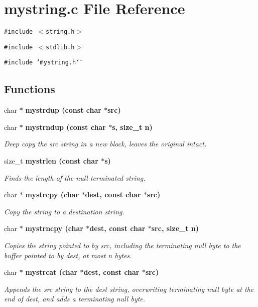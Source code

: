 \section{mystring.c File Reference}
\label{mystring_8c}
{\tt \#include $<$string.h$>$}\par
{\tt \#include $<$stdlib.h$>$}\par
{\tt \#include \char`\"{}mystring.h\char`\"{}}\par
\subsection*{Functions}
\begin{CompactItemize}
\item 
char $\ast$ \bf{mystrdup} (const char $\ast$src)
\item 
char $\ast$ \bf{mystrndup} (const char $\ast$s, size\_\-t n)
\begin{CompactList}\small\item\em Deep copy the src string in a new block, leaves the original intact. \item\end{CompactList}\item 
size\_\-t \bf{mystrlen} (const char $\ast$s)
\begin{CompactList}\small\item\em Finds the length of the null terminated string. \item\end{CompactList}\item 
char $\ast$ \bf{mystrcpy} (char $\ast$dest, const char $\ast$src)
\begin{CompactList}\small\item\em Copy the string to a destination string. \item\end{CompactList}\item 
char $\ast$ \bf{mystrncpy} (char $\ast$dest, const char $\ast$src, size\_\-t n)
\begin{CompactList}\small\item\em Copies the string pointed to by src, including the terminating null byte to the buffer pointed to by dest, at most n bytes. \item\end{CompactList}\item 
char $\ast$ \bf{mystrcat} (char $\ast$dest, const char $\ast$src)
\begin{CompactList}\small\item\em Appends the src string to the dest string, overwriting terminating null byte at the end of dest, and adds a terminating null byte. \item\end{CompactList}\item 

\end{CompactItemize}
